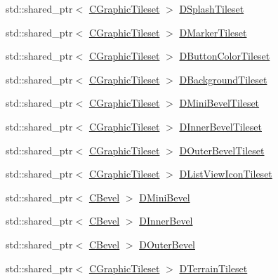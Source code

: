 \begin{DoxyCompactItemize}
\item 
std\+::shared\+\_\+ptr$<$ \hyperlink{classCGraphicTileset}{C\+Graphic\+Tileset} $>$ \hyperlink{classCApplicationData_aea23915b726e1a5aa68a309109679ae1}{D\+Splash\+Tileset}
\item 
std\+::shared\+\_\+ptr$<$ \hyperlink{classCGraphicTileset}{C\+Graphic\+Tileset} $>$ \hyperlink{classCApplicationData_ae9f336696b810bff2353d731300ec9d7}{D\+Marker\+Tileset}
\item 
std\+::shared\+\_\+ptr$<$ \hyperlink{classCGraphicTileset}{C\+Graphic\+Tileset} $>$ \hyperlink{classCApplicationData_a7482e0b4d7e0ce4979eb9f28872023ad}{D\+Button\+Color\+Tileset}
\item 
std\+::shared\+\_\+ptr$<$ \hyperlink{classCGraphicTileset}{C\+Graphic\+Tileset} $>$ \hyperlink{classCApplicationData_a93e478c5552a527fe2d680cac8fc910d}{D\+Background\+Tileset}
\item 
std\+::shared\+\_\+ptr$<$ \hyperlink{classCGraphicTileset}{C\+Graphic\+Tileset} $>$ \hyperlink{classCApplicationData_a74527a373eef061540615e61928f9706}{D\+Mini\+Bevel\+Tileset}
\item 
std\+::shared\+\_\+ptr$<$ \hyperlink{classCGraphicTileset}{C\+Graphic\+Tileset} $>$ \hyperlink{classCApplicationData_ae62d58d93397422437d8f50acfca23e6}{D\+Inner\+Bevel\+Tileset}
\item 
std\+::shared\+\_\+ptr$<$ \hyperlink{classCGraphicTileset}{C\+Graphic\+Tileset} $>$ \hyperlink{classCApplicationData_ac1ebf4e2d6c8a445c7e8de643a348093}{D\+Outer\+Bevel\+Tileset}
\item 
std\+::shared\+\_\+ptr$<$ \hyperlink{classCGraphicTileset}{C\+Graphic\+Tileset} $>$ \hyperlink{classCApplicationData_ab00db57ca7c624d026ed1fc108bc5b38}{D\+List\+View\+Icon\+Tileset}
\item 
std\+::shared\+\_\+ptr$<$ \hyperlink{classCBevel}{C\+Bevel} $>$ \hyperlink{classCApplicationData_ad6718b216878d9fe05b26cd24b89c6ee}{D\+Mini\+Bevel}
\item 
std\+::shared\+\_\+ptr$<$ \hyperlink{classCBevel}{C\+Bevel} $>$ \hyperlink{classCApplicationData_a29a687c44dceb9e87a56d96612d59ab5}{D\+Inner\+Bevel}
\item 
std\+::shared\+\_\+ptr$<$ \hyperlink{classCBevel}{C\+Bevel} $>$ \hyperlink{classCApplicationData_abc2b04aa05148da81145ff6d6bc2bf01}{D\+Outer\+Bevel}
\item 
std\+::shared\+\_\+ptr$<$ \hyperlink{classCGraphicTileset}{C\+Graphic\+Tileset} $>$ \hyperlink{classCApplicationData_acd9fb0d0ea35a6d93e8ec9212db8ef83}{D\+Terrain\+Tileset}
\item 

\end{DoxyCompactItemize}
